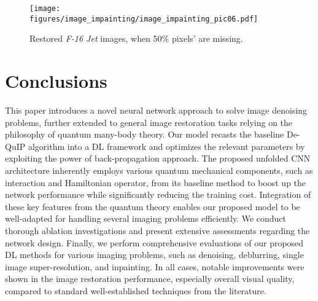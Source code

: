 \documentclass[10pt,journal,compsoc]{IEEEtran}
\newcommand{\dk}{\textcolor{black}}
\begin{document}







\begin{figure}[t!]
\begin{centering}

\texttt{[image: figures/image\_impainting/image\_impainting\_pic06.pdf]}

\end{centering}
\caption{Restored \textit{F-16 Jet} images, when 50\% pixels' are missing.}
\label{fig:image_inpainting}
\end{figure}







\section{Conclusions}
\label{sec:conclusion}

This paper introduces a novel neural network approach to solve image denoising problems, further extended to general image restoration tasks relying on the philosophy of quantum many-body theory. Our model recasts the baseline De-QuIP algorithm into a DL framework and optimizes the relevant parameters by exploiting the power of back-propagation approach. The proposed unfolded CNN architecture inherently employs various quantum mechanical components, such as interaction and Hamiltonian operator, from its baseline method to boost up the network performance while significantly reducing the training cost.
Integration of these key features from the quantum theory enables our proposed model to be well-adapted for handling several imaging problems efficiently. We conduct thorough ablation investigations and present extensive assessments regarding the network design. Finally, we perform comprehensive evaluations of our proposed DL methods for various imaging problems, such as denoising, deblurring, single image super-resolution, and inpainting. In all cases, notable improvements were shown in the image restoration performance, especially overall visual quality, compared to standard well-established techniques from the literature.
\end{document}
